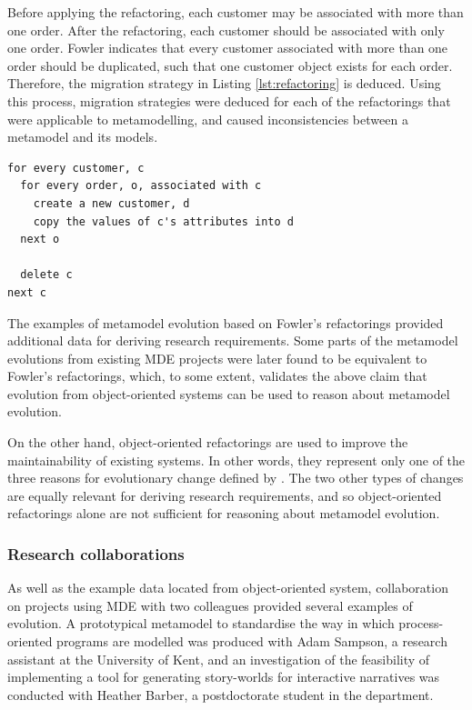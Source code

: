 Before applying the refactoring, each customer may be associated with more than one order. After the refactoring, each customer should be associated with only one order. Fowler indicates that every customer associated with more than one order should be duplicated, such that one customer object exists for each order. Therefore, the migration strategy in Listing \ref{lst:refactoring} is deduced. Using this process, migration strategies were deduced for each of the refactorings that were applicable to metamodelling, and caused inconsistencies between a metamodel and its models.

\begin{lstlisting}[caption=Migration strategy for the refactoring in pseudo code., label=lst:refactoring]
for every customer, c
  for every order, o, associated with c
    create a new customer, d
    copy the values of c's attributes into d
  next o
	
  delete c
next c
\end{lstlisting}

The examples of metamodel evolution based on Fowler's refactorings provided additional data for deriving research requirements. Some parts of the metamodel evolutions from existing MDE projects were later found to be equivalent to Fowler's refactorings, which, to some extent, validates the above claim that evolution from object-oriented systems can be used to reason about metamodel evolution.

On the other hand, object-oriented refactorings are used to improve the maintainability of existing systems. In other words, they represent only one of the three reasons for evolutionary change defined by \cite{sjoberg93quantifying}. The two other types of changes are equally relevant for deriving research requirements, and so object-oriented refactorings alone are not sufficient for reasoning about metamodel evolution.


\subsubsection{Research collaborations}
As well as the example data located from object-oriented system, collaboration on projects using MDE with two colleagues provided several examples of evolution. A prototypical metamodel to standardise the way in which process-oriented programs are modelled was produced with Adam Sampson, a research assistant at the University of Kent, and an investigation of the feasibility of implementing a tool for generating story-worlds for interactive narratives was conducted with Heather Barber, a postdoctorate student in the department.

